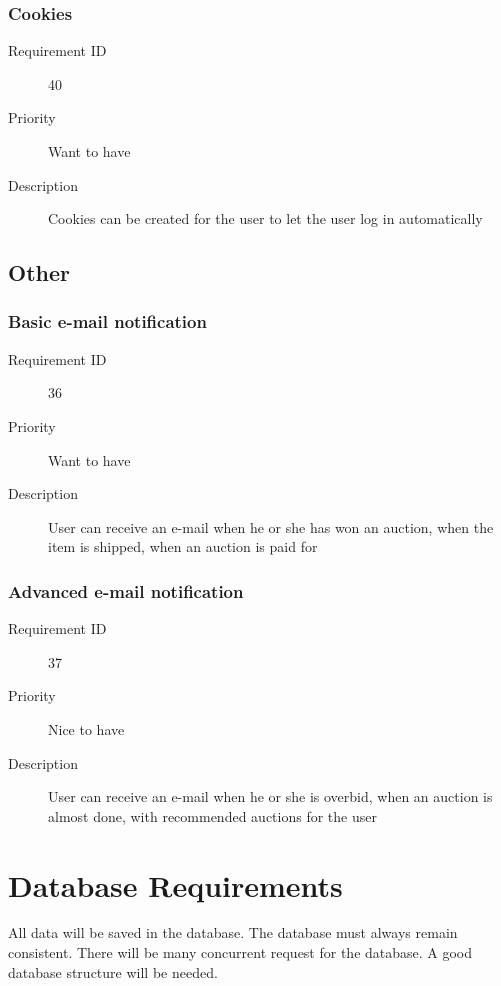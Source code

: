 		\subsubsection{Cookies}
			\begin{description}
				\item[Requirement ID] 40
				\item[Priority] Want to have
				\item[Description] Cookies can be created for the user to let the user log in 
					automatically
			\end{description}
	\subsection{Other}
		\subsubsection{Basic e-mail notification}
			\begin{description}
				\item[Requirement ID] 36
				\item[Priority] Want to have
				\item[Description] User can receive an e-mail when he or she has won an auction,
					when the item is shipped, when an auction is paid for
			\end{description}
		\subsubsection{Advanced e-mail notification}
			\begin{description}
				\item[Requirement ID] 37
				\item[Priority] Nice to have
				\item[Description] User can receive an e-mail when he or she is overbid,
					when an auction is almost done, with recommended auctions for the user
			\end{description}
\section{Database Requirements}
	All data will be saved in the database. The database must always remain consistent. There will be many concurrent request 
	for the database. A good database structure will be needed. 
